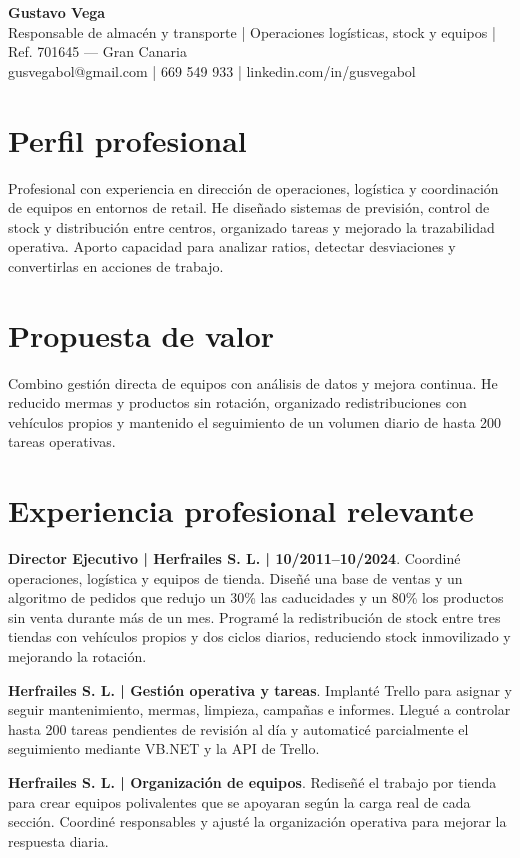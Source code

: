 \documentclass[10pt,a4paper]{article}
\begin{document}
{\fontsize{18}{21}\selectfont\bfseries Gustavo Vega}\\
{\fontsize{11}{13}\selectfont Responsable de almacén y transporte | Operaciones logísticas, stock y equipos | Ref. 701645 — Gran Canaria}\\
{\fontsize{10.5}{12}\selectfont gusvegabol@gmail.com | 669 549 933 | linkedin.com/in/gusvegabol}

\section*{Perfil profesional}
Profesional con experiencia en dirección de operaciones, logística y coordinación de equipos en entornos de retail. He diseñado sistemas de previsión, control de stock y distribución entre centros, organizado tareas y mejorado la trazabilidad operativa. Aporto capacidad para analizar ratios, detectar desviaciones y convertirlas en acciones de trabajo.

\section*{Propuesta de valor}
Combino gestión directa de equipos con análisis de datos y mejora continua. He reducido mermas y productos sin rotación, organizado redistribuciones con vehículos propios y mantenido el seguimiento de un volumen diario de hasta 200 tareas operativas.

\section*{Experiencia profesional relevante}
\textbf{Director Ejecutivo | Herfrailes S. L. | 10/2011–10/2024}. Coordiné operaciones, logística y equipos de tienda. Diseñé una base de ventas y un algoritmo de pedidos que redujo un 30\% las caducidades y un 80\% los productos sin venta durante más de un mes. Programé la redistribución de stock entre tres tiendas con vehículos propios y dos ciclos diarios, reduciendo stock inmovilizado y mejorando la rotación.

\textbf{Herfrailes S. L. | Gestión operativa y tareas}. Implanté Trello para asignar y seguir mantenimiento, mermas, limpieza, campañas e informes. Llegué a controlar hasta 200 tareas pendientes de revisión al día y automaticé parcialmente el seguimiento mediante VB.NET y la API de Trello.

\textbf{Herfrailes S. L. | Organización de equipos}. Rediseñé el trabajo por tienda para crear equipos polivalentes que se apoyaran según la carga real de cada sección. Coordiné responsables y ajusté la organización operativa para mejorar la respuesta diaria.
\end{document}
